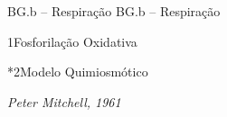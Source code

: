 \documentclass[\mainfilename]{subfiles}
\begin{document}
{BG.b -- Respiração}
{BG.b -- Respiração}

\begin{sectionBox}1{Fosforilação Oxidativa}
    
    \begin{sectionBox}*2{Modelo Quimiosmótico}
        
        \textit{Peter Mitchell, 1961}

        
        
    \end{sectionBox}
    
\end{sectionBox}
\end{document}
